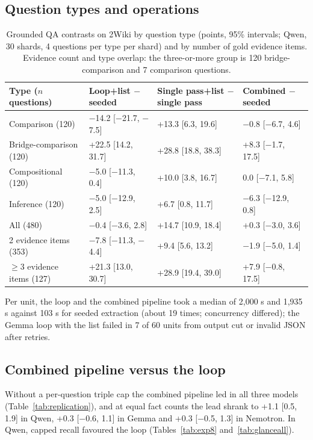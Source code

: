 \subsection{Question types and operations}
\begin{table}[t]
\centering
\caption{Grounded QA contrasts on 2Wiki by question type (points, 95\% intervals; Qwen, 30 shards, 4 questions per type per shard) and by number of gold evidence items. Evidence count and type overlap: the three-or-more group is 120 bridge-comparison and 7 comparison questions.}
\label{tab:qtype}
\scriptsize\setlength{\tabcolsep}{1.5pt}
\begin{tabular}{P{2.45cm}P{2.2cm}P{2.2cm}P{2.2cm}}
\toprule
Type ($n$ questions) & Loop+list $-$ seeded & Single pass+list $-$ single pass & Combined $-$ seeded \\
\midrule
Comparison (120) & $-$14.2 [$-$21.7, $-$7.5] & +13.3 [6.3, 19.6] & $-$0.8 [$-$6.7, 4.6] \\
Bridge-comparison (120) & +22.5 [14.2, 31.7] & +28.8 [18.8, 38.3] & +8.3 [$-$1.7, 17.5] \\
Compositional (120) & $-$5.0 [$-$11.3, 0.4] & +10.0 [3.8, 16.7] & 0.0 [$-$7.1, 5.8] \\
Inference (120) & $-$5.0 [$-$12.9, 2.5] & +6.7 [0.8, 11.7] & $-$6.3 [$-$12.9, 0.8] \\
All (480) & $-$0.4 [$-$3.6, 2.8] & +14.7 [10.9, 18.4] & +0.3 [$-$3.0, 3.6] \\
 evidence items (353) & $-$7.8 [$-$11.3, $-$4.4] & +9.4 [5.6, 13.2] & $-$1.9 [$-$5.0, 1.4] \\
$\ge$3 evidence items (127) & +21.3 [13.0, 30.7] & +28.9 [19.4, 39.0] & +7.9 [$-$0.8, 17.5] \\
\bottomrule
\end{tabular}
\end{table}
Per unit, the loop and the combined pipeline took a median of 2,000 s and 1,935 s against 103 s for seeded extraction (about 19 times; concurrency differed); the Gemma loop with the list failed in 7 of 60 units from output cut or invalid JSON after retries.

\subsection{Combined pipeline versus the loop}
Without a per-question triple cap the combined pipeline led in all three models (Table~\ref{tab:replication}), and at equal fact counts the lead shrank to +1.1 [0.5, 1.9] in Qwen, +0.3 [$-$0.6, 1.1] in Gemma and +0.3 [$-$0.5, 1.3] in Nemotron. In Qwen, capped recall favoured the loop (Tables~\ref{tab:exp8} and~\ref{tab:glanceall}).


